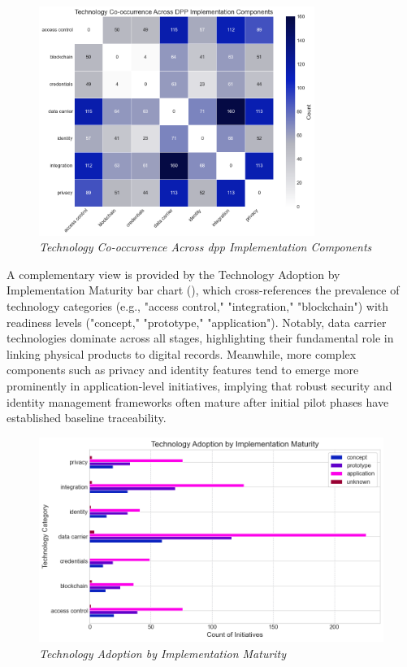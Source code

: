 \begin{figure}[htbp]
  \centering
  \includegraphics[width=0.8\textwidth]{figures/initiatives_tech_cooccurrence.png}
  \caption{%
    \textit{Technology Co-occurrence Across \ac{dpp} Implementation Components} 
  }
  \label{fig:initiatives_tech_cooccurrence}
\end{figure}

A complementary view is provided by the Technology Adoption by Implementation Maturity bar chart (), which cross-references the prevalence of technology categories (e.g., "access control," "integration," "blockchain") with readiness levels ("concept," "prototype," "application"). Notably, data carrier technologies dominate across all stages, highlighting their fundamental role in linking physical products to digital records. Meanwhile, more complex components such as privacy and identity features tend to emerge more prominently in application-level initiatives, implying that robust security and identity management frameworks often mature after initial pilot phases have established baseline traceability.

\begin{figure}[htbp]
  \centering
  \vspace{-10pt}
  \includegraphics[width=\textwidth]{figures/initiatives_tech_adoption_by_maturity.png}
  \vspace{-10pt}
  \caption{%
    \textit{Technology Adoption by Implementation Maturity} 
  }
  \label{fig:initiatives_tech_adoption_by_maturity}
\end{figure}

